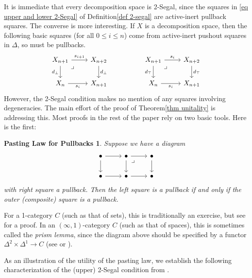 \documentclass{conm-p-l}
\newtheorem*{pastinglaw}{Pasting Law for Pullbacks}
\theoremstyle{definition}
\theoremstyle{remark}
\begin{document}
It is immediate that every decomposition space is 2-Segal, since the squares in \eqref{eq upper and lower 2-Segal} of Definition\nobreakspace \ref {def 2-segal} are active-inert pullback squares.
The converse is more interesting.
If $X$ is a decomposition space, then the following basic squares (for all $0 \leq i \leq n$) come from active-inert pushout squares in $\Delta$, so must be pullbacks.
\[ \begin{tikzcd}
X_{n+1} \rar{s_{i+1}} \dar[swap]{d_\bot} \ar[dr, phantom, "\lrcorner" very near start]  & X_{n+2} \dar{d_\bot} 
& &
X_{n+1} \rar{s_i} \dar[swap]{d_\top} \ar[dr, phantom, "\lrcorner" very near start]  & X_{n+2} \dar{d_\top} 
\\
X_n  \rar[swap]{s_i} & X_{n+1} 
& &
X_n  \rar[swap]{s_i} & X_{n+1}
\end{tikzcd}
\]
However, the 2-Segal condition makes no mention of any squares involving degeneracies.
The main effort of the proof of Theorem\nobreakspace \ref {thm unitality} is addressing this.
Most proofs in the rest of the paper rely on two basic tools.
Here is the first:

\begin{pastinglaw}
Suppose we have a diagram
\[ \begin{tikzcd}
\bullet \rar \dar & \bullet \rar \dar \ar[dr, phantom, "\lrcorner" very near start] & \bullet \dar \\
\bullet \rar & \bullet \rar & \bullet 
\end{tikzcd} \]
with right square a pullback.
Then the left square is a pullback if and only if the outer (composite) square is a pullback.
\end{pastinglaw}

For a 1-category $C$ (such as that of sets), this is traditionally an exercise, but see \cite[Proposition 2.5.9]{Borceux:HCA1} for a proof.
In an $(\infty,1)$-category $C$ (such as that of spaces), this is sometimes called the \emph{prism lemma}, since the diagram above should be specified by a functor $\Delta^2 \times \Delta^1 \to C$ (see \cite[Lemma 4.4.2.1]{Lurie:HTT} or \cite[\href{https://kerodon.net/tag/03FZ}{Tag 03FZ}]{kerodon}).

As an illustration of the utility of the pasting law, we establish the following characterization of the (upper) 2-Segal condition from \cite[Lemma 3.6]{GKT1}.
\end{document}
